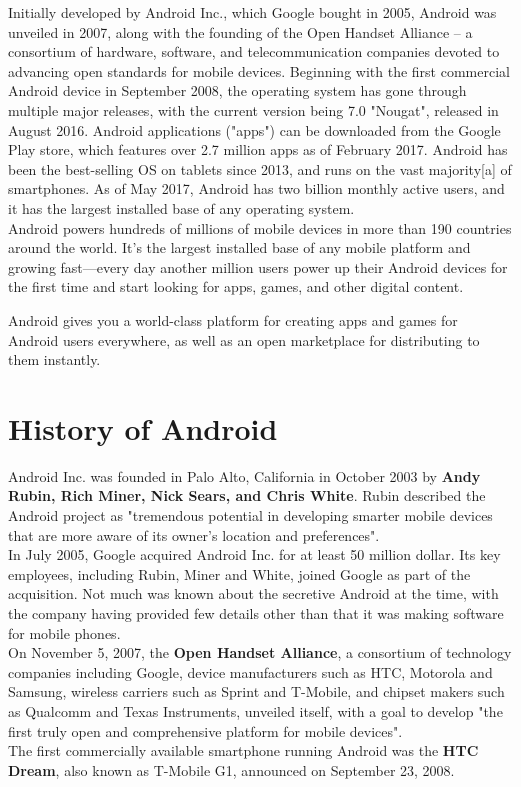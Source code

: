 \documentclass[twoside,a4paper,16pt]{book}
\begin{document}
 \vspace{0.2cm}


Initially developed by Android Inc., which Google bought in 2005, Android was unveiled in 2007, along with the founding of the Open Handset Alliance – a consortium of hardware, software, and telecommunication companies devoted to advancing open standards for mobile devices. Beginning with the first commercial Android device in September 2008, the operating system has gone through multiple major releases, with the current version being 7.0 "Nougat", released in August 2016. Android applications ("apps") can be downloaded from the Google Play store, which features over 2.7 million apps as of February 2017. Android has been the best-selling OS on tablets since 2013, and runs on the vast majority[a] of smartphones. As of May 2017, Android has two billion monthly active users, and it has the largest installed base of any operating system.\\
 Android powers hundreds of millions of mobile devices in more than 190 countries around the world. It's the largest installed base of any mobile platform and growing fast—every day another million users power up their Android devices for the first time and start looking for apps, games, and other digital content.

Android gives you a world-class platform for creating apps and games for Android users everywhere, as well as an open marketplace for distributing to them instantly.\\

\section{History of Android}
Android Inc. was founded in Palo Alto, California in October 2003 by {\bf Andy Rubin, Rich Miner, Nick Sears, and Chris White}.  Rubin described the Android project as "tremendous potential in developing smarter mobile devices that are more aware of its owner's location and preferences".\\
In July 2005, Google acquired Android Inc. for at least 50 million dollar. Its key employees, including Rubin, Miner and White, joined Google as part of the acquisition. Not much was known about the secretive Android at the time, with the company having provided few details other than that it was making software for mobile phones.\\
On November 5, 2007, the {\bf Open Handset Alliance}, a consortium of technology companies including Google, device manufacturers such as HTC, Motorola and Samsung, wireless carriers such as Sprint and T-Mobile, and chipset makers such as Qualcomm and Texas Instruments, unveiled itself, with a goal to develop "the first truly open and comprehensive platform for mobile devices".\\
The first commercially available smartphone running Android was the {\bf HTC Dream}, also known as T-Mobile G1, announced on September 23, 2008.\\
\end{document}
